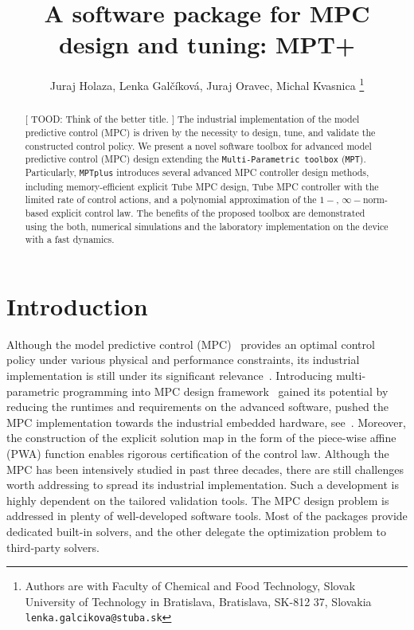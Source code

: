 \documentclass[letterpaper, 10 pt, conference]{ieeeconf}
\title{\LARGE \bf
A software package for MPC design and tuning: MPT+
}
\author{Juraj Holaza, Lenka Gal\v{c}\'{i}kov\'{a}, Juraj Oravec, Michal Kvasnica
\thanks{Authors are with Faculty of Chemical and Food Technology,
		Slovak University of Technology in Bratislava, Bratislava, SK-812 37, Slovakia
        \texttt{lenka.galcikova@stuba.sk}}
}
\begin{document}
\maketitle
\thispagestyle{empty}
\pagestyle{empty}

\begin{abstract}

[ TOOD: Think of the better title. ]
The industrial implementation of the model predictive control (MPC) is driven by the necessity to design, tune, and validate the constructed control policy. 
We present a novel software toolbox for advanced model predictive control (MPC) design extending the \texttt{Multi-Parametric toolbox} (\texttt{MPT}).  Particularly, \texttt{MPTplus} introduces several advanced MPC controller design methods, including memory-efficient explicit Tube MPC design, Tube MPC controller with the limited rate of control actions, and a polynomial approximation of the $1-$, $\infty-$norm-based explicit control law. The benefits of the proposed toolbox are demonstrated using the both, numerical simulations and the laboratory implementation on the device with a fast dynamics.  

\end{abstract}

\section{Introduction}
\label{sec:introduction}

Although the model predictive control (MPC)~\cite{M00, B17} provides an optimal control policy under various physical and performance constraints, its industrial implementation is still under its significant relevance~\cite{QB03}. 
Introducing multi-parametric programming into MPC design framework~\cite{BM02} gained its potential by reducing the runtimes and requirements on the advanced software, pushed the MPC implementation towards the industrial embedded hardware, see~\cite{PK21}. Moreover, the construction of the explicit solution map in the form of the piece-wise affine (PWA) function enables rigorous certification of the control law. 
%
Although the MPC has been intensively studied in past three decades, there are still challenges worth addressing to spread its industrial implementation. Such a development is highly dependent on the tailored validation tools. 
The MPC design problem is addressed in plenty of well-developed software tools. Most of the packages provide dedicated built-in solvers, and the other delegate the optimization problem to third-party solvers. 
\end{document}
